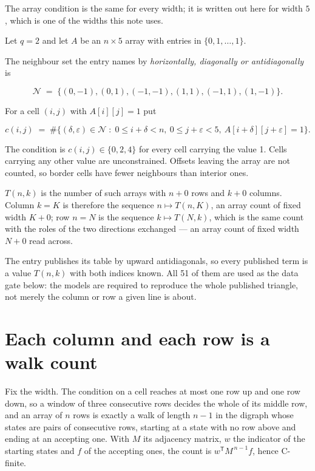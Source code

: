 \documentclass[11pt]{article}
\theoremstyle{definition}
\begin{document}
The array condition is the same for every width; it is written out here for width $5$, which is one of the widths this note uses.

Let $q = 2$ and let $A$ be an $n \times 5$ array with entries in $\{0,1,\dots,1\}$.

The neighbour set the entry names by {\itshape horizontally, diagonally or antidiagonally} is

\[\mathcal{N} \;=\; \{(0,-1), (0,1), (-1,-1), (1,1), (-1,1), (1,-1)\}.\]

For a cell $(i,j)$ with $A[i][j] = 1$ put

\[c(i,j) \;=\; \#\bigl\{(\delta,\varepsilon)\in\mathcal{N} \;:\; 0\le i+\delta<n,\ 0\le j+\varepsilon<5,\ A[i+\delta][j+\varepsilon] = 1\bigr\}.\]

The condition is $c(i,j) \in \{0, 2, 4\}$ for every cell carrying the value 1. Cells carrying any other value are unconstrained. Offsets leaving the array are not counted, so border cells have fewer neighbours than interior ones.

$T(n,k)$ is the number of such arrays with $n + 0$ rows and $k + 0$ columns. Column $k = K$ is therefore the sequence $n \mapsto T(n,K)$, an array count of fixed width $K + 0$; row $n = N$ is the sequence $k \mapsto T(N,k)$, which is the same count with the roles of the two directions exchanged --- an array count of fixed width $N + 0$ read across.

The entry publishes its table by upward antidiagonals, so every published term is a value $T(n,k)$ with both indices known. All 51 of them are used as the data gate below: the models are required to reproduce the whole published triangle, not merely the column or row a given line is about.

\section{Each column and each row is a walk count}

Fix the width. The condition on a cell reaches at most one row up and one row down, so a window of three consecutive rows decides the whole of its middle row, and an array of $n$ rows is exactly a walk of length $n-1$ in the digraph whose states are pairs of consecutive rows, starting at a state with no row above and ending at an accepting one. With $M$ its adjacency matrix, $w$ the indicator of the starting states and $f$ of the accepting ones, the count is $w^{\mathsf T}M^{\,n-1}f$, hence C-finite.
\end{document}
